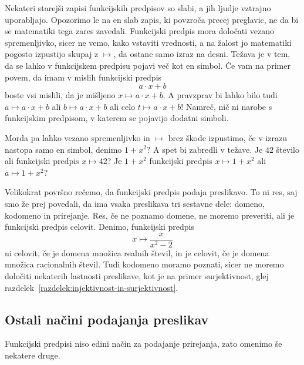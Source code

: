 Nekateri starejši zapisi funkcijskih predpisov so slabi, a jih ljudje vztrajno
uporabljajo. Opozorimo le na en slab zapis, ki povzroča precej preglavic, ne da bi se
matematiki tega zares zavedali. Funkcijski predpis mora določati vezano spremenljivko,
sicer ne vemo, kako vstaviti vrednosti, a na žalost jo matematiki pogosto izpustijo skupaj
z $\mapsto$, da ostane samo izraz na desni.
%
Težava je v tem, da se lahko v funkcijskem predpisu pojavi več kot en simbol. Če vam na primer povem, da imam v mislih funkcijski predpis
%
\begin{equation*}
  a \cdot x + b
\end{equation*}
%
boste vsi mislili, da je mišljeno $x \mapsto a \cdot x + b$. A pravzprav bi lahko bilo
tudi $a \mapsto a \cdot x + b$ ali $b \mapsto a \cdot x + b$ ali celo
$t \mapsto a \cdot x + b$! Namreč, nič ni narobe s funkcijskim predpisom, v katerem se
pojavijo dodatni simboli.

Morda pa lahko vezano spremenljivko in $\mapsto$ brez škode izpustimo, če v izrazu nastopa
samo en simbol, denimo $1 + x^2?$
%
A spet bi zabredli v težave. Je $42$ število ali funkcijski predpis $x \mapsto 42$? Je
$1 + x^2$ funkcijski predpis $x \mapsto 1 + x^2$ ali $a \mapsto 1 + x^2$?

Velikokrat površno rečemo, da funkcijski predpis podaja preslikavo. To ni res, saj smo že
prej povedali, da ima vsaka preslikava tri sestavne dele: domeno, kodomeno in prirejanje.
Res, če ne poznamo domene, ne moremo preveriti, ali je funkcijski predpis celovit. Denimo,
funkcijski predpis
%
\begin{equation*}
  x \mapsto \frac{x}{x^2 - 2}
\end{equation*}
%
ni celovit, če je domena množica realnih števil, in je celovit, če je domena množica
racionalnih števil. Tudi kodomeno moramo poznati, sicer ne moremo določiti nekaterih
lastnosti preslikave, kot je na primer surjektivnost, glej
razdelek~\ref{razdelek:injektivnost-in-surjektivnost}.



\subsection{Ostali načini podajanja preslikav}
\label{sec:ostali-predpisi}

Funkcijski predpisi niso edini način za podajanje prirejanja, zato omenimo še nekatere
druge.

